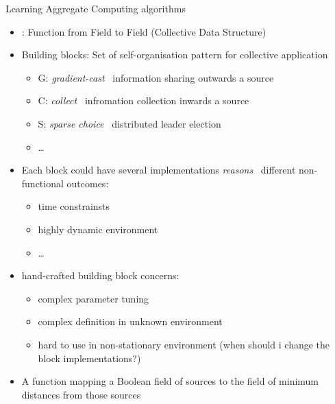 \documentclass[8pt, aspectratio=169, handout]{beamer}
\begin{document}
\begin{frame}[allowframebreaks]{Learning Aggregate Computing algorithms}
  \begin{cardTiny}
    \begin{itemize}
      \item {}: Function from Field to Field (Collective Data Structure)
      \item Building blocks: Set of self-organisation pattern for collective application
      \begin{itemize}
        \item G: \emph{gradient-cast} \faArrowRight \,  information sharing outwards a source
        \item C: \emph{collect} \faArrowRight \, infromation collection inwards a source
        \item S: \emph{sparse choice} \faArrowRight \, distributed leader election
        \item \dots
      \end{itemize}
      \item Each block could have several implementations \emph{reasons} \faArrowRight \, different non-functional
      outcomes:
      \begin{itemize}
        \item time constrainsts
        \item highly dynamic environment
        \item \dots
      \end{itemize}
      \item[\failure{\faThumbsDown}] hand-crafted building block concerns:
      \begin{itemize}
        \item complex parameter tuning
        \item complex definition in unknown environment
        \item hard to use in non-stationary environment (when should i change the block implementations?)
      \end{itemize}
    \end{itemize}
  \end{cardTiny}
  \begin{card}
    \begin{itemize}
      \item A function mapping a Boolean field of sources to the field of minimum distances from those sources
      \begin{itemize}

\end{itemize}
\end{itemize}
\end{card}
\end{frame}
\end{document}
